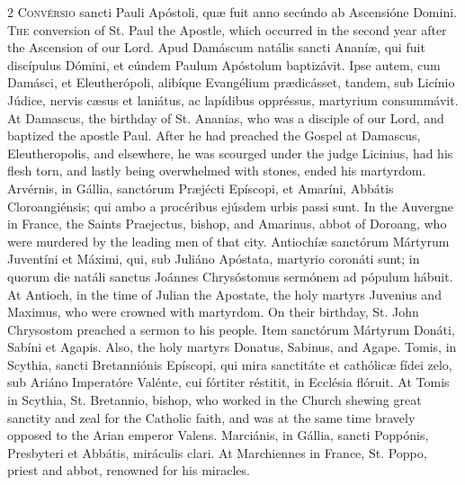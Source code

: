 \begin{paracol}{2}
\lettrine[lines=2]{C}{onvérsio} sancti Pauli Apóstoli, quæ fuit anno 
 secúndo ab Ascensióne Domini.
\switchcolumn
{}
\lettrine[lines=2]{T}{he} conversion of St. Paul the Apostle, which occurred in the second year 
 after the Ascension of our Lord.
\switchcolumn*
{}
Apud Damáscum natális sancti Ananíæ, qui fuit 
 discípulus Dómini, et eúndem Paulum Apóstolum baptizávit. Ipse autem, 
 cum Damásci, et Eleutherópoli, alibíque Evangélium prædicásset, tandem, sub 
 Licínio Júdice, nervis cæsus et laniátus, ac lapídibus oppréssus, martyrium 
 consummávit.
\switchcolumn
{}
At Damascus, the birthday of St. Ananias, who was a disciple of our Lord, 
 and baptized the apostle Paul. After he had preached the Gospel at 
 Damascus, Eleutheropolis, and elsewhere, he was scourged under the judge 
 Licinius, had his flesh torn, and lastly being overwhelmed with stones, 
 ended his martyrdom.
\switchcolumn*
{}
Arvérnis, in Gállia, sanctórum Præjécti 
 Epíscopi, et Amaríni, Abbátis Cloroangiénsis; qui ambo a procéribus ejúsdem 
 urbis passi sunt.
\switchcolumn
{}
In the Auvergne in France, the Saints Praejectus, bishop, and Amarinus, 
 abbot of Doroang, who were murdered by the leading men of that city.
\switchcolumn*
{}
Antiochíæ sanctórum Mártyrum Juventíni et 
 Máximi, qui, sub Juliáno Apóstata, martyrio coronáti sunt; in quorum die 
 natáli sanctus Joánnes Chrysóstomus sermónem ad pópulum hábuit.
\switchcolumn
{}
At Antioch, in the time of Julian the Apostate, the holy martyrs Juvenius 
 and Maximus, who were crowned with martyrdom. On their birthday, St. 
 John Chrysostom preached a sermon to his people.
\switchcolumn*
{}
Item sanctórum Mártyrum Donáti, Sabíni et Agapis.
\switchcolumn
{}
Also, the holy martyrs Donatus, Sabinus, and Agape.
\switchcolumn*
{}
Tomis, in Scythia, sancti Bretanniónis Epíscopi, qui mira sanctitáte et 
 cathólicæ fídei zelo, sub Ariáno Imperatóre 
 Valénte, cui fórtiter réstitit, in Ecclésia flóruit.
\switchcolumn
{}
At Tomis in Scythia, St. Bretannio, bishop, who worked in the Church shewing 
 great sanctity and zeal for the Catholic faith, and was at the same time 
 bravely opposed to the Arian emperor Valens.
\switchcolumn*
{}
Marciánis, in Gállia, sancti Poppónis, Presbyteri et Abbátis, miráculis 
 clari.
\switchcolumn
{}
At Marchiennes in France, St. Poppo, priest and abbot, renowned for his 
 miracles.
\switchcolumn*
{}
\end{paracol}


